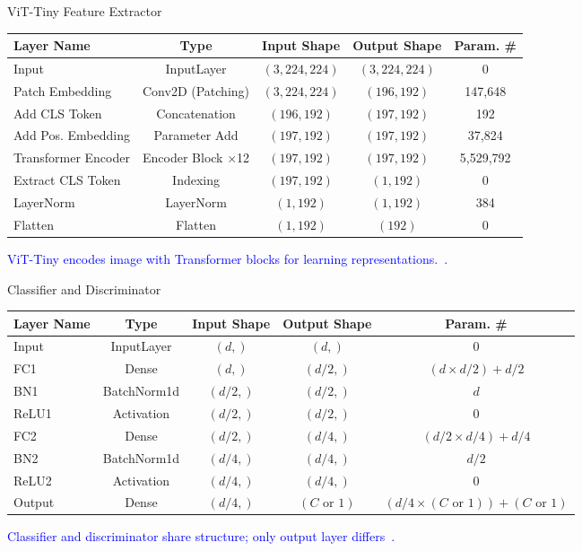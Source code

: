 \documentclass[aspectratio=169]{beamer}
\let\oldcite\cite %
\renewcommand{\cite}[1]{{\tiny\oldcite{#1}}}
\begin{document}
\begin{frame}{ViT-Tiny Feature Extractor}

\begin{table}
\begin{tabularx}{\linewidth}{lcccc}
\toprule
\textbf{Layer Name} & \textbf{Type} & \textbf{Input Shape} & \textbf{Output Shape} & \textbf{Param. \#} \\
\midrule
Input & InputLayer & $(3,224,224)$ & $(3,224,224)$ & 0 \\
Patch Embedding & Conv2D (Patching) & $(3,224,224)$ & $(196,192)$ & 147,648 \\
Add CLS Token & Concatenation & $(196,192)$ & $(197,192)$ & 192 \\
Add Pos. Embedding & Parameter Add & $(197,192)$ & $(197,192)$ & 37,824 \\
Transformer Encoder & Encoder Block $\times$12 & $(197,192)$ & $(197,192)$ & 5,529,792 \\
Extract CLS Token & Indexing & $(197,192)$ & $(1,192)$ & 0 \\
LayerNorm & LayerNorm & $(1,192)$ & $(1,192)$ & 384 \\
Flatten & Flatten & $(1,192)$ & $(192)$ & 0 \\
\bottomrule
\end{tabularx}
\end{table}
\begin{center}
    \textcolor{blue}{ViT-Tiny encodes image with  Transformer blocks for learning representations.~\cite{dosovitskiy2020image}.}
\end{center}

\end{frame}
\begin{frame}{Classifier and Discriminator}
\begin{table}
\begin{tabularx}{\linewidth}{lcccc}
\toprule
\textbf{Layer Name} & \textbf{Type} & \textbf{Input Shape} & \textbf{Output Shape} & \textbf{Param. \#} \\
\midrule
Input   & InputLayer  & $(d,)$ & $(d,)$ & 0 \\
FC1     & Dense       & $(d,)$ & $(d/2,)$ & $(d \times d/2)+d/2$ \\
BN1     & BatchNorm1d & $(d/2,)$ & $(d/2,)$ & $d$ \\
ReLU1   & Activation  & $(d/2,)$ & $(d/2,)$ & 0 \\
FC2     & Dense       & $(d/2,)$ & $(d/4,)$ & $(d/2 \times d/4)+d/4$ \\
BN2     & BatchNorm1d & $(d/4,)$ & $(d/4,)$ & $d/2$ \\
ReLU2   & Activation  & $(d/4,)$ & $(d/4,)$ & 0 \\
Output  & Dense       & $(d/4,)$ & $(C \text{ or } 1)$ & $(d/4 \times (C \text{ or } 1))+(C \text{ or } 1)$ \\
\bottomrule
\end{tabularx}
\end{table}
\begin{center}
    \textcolor{blue}{Classifier and discriminator share structure; only output layer differs~\cite{ganin2016domain}.}
\end{center}
\end{frame}
\end{document}
